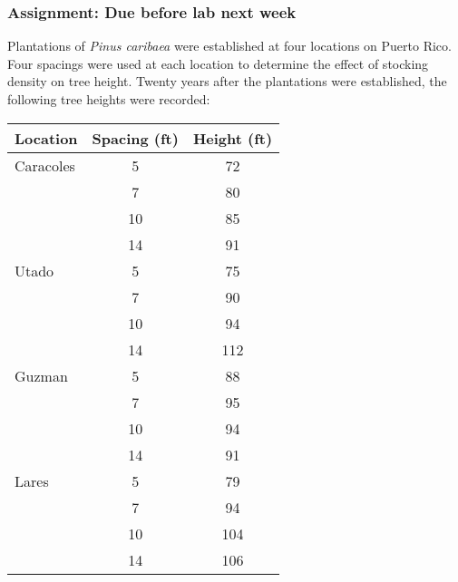 \documentclass[color=usenames,dvipsnames]{beamer}\usepackage[]{graphicx}\usepackage[]{color}
\begin{document}
\begin{frame}
  \frametitle{Assignment: Due before lab next week}
  \tiny
  Plantations of {\it Pinus caribaea} were established at
  four locations on Puerto Rico.  %
  Four spacings were used at each location to determine the effect of
  stocking density on tree height. Twenty years after the
  plantations were established, the following tree heights were recorded: \par
  \vfill
{  \centering
    \tiny %
    \begin{tabular}{lcc}
      \hline
      Location  & Spacing (ft) & Height (ft) \\
      \hline
      Caracoles & 5            & 72          \\
                & 7            & 80          \\
                & 10           & 85          \\
                & 14           & 91          \\
      Utado     & 5            & 75          \\
                & 7            & 90          \\
                & 10           & 94          \\
                & 14           & 112         \\
      Guzman    & 5            & 88          \\
                & 7            & 95          \\
                & 10           & 94          \\
                & 14           & 91          \\
      Lares     & 5            & 79          \\
                & 7            & 94          \\
                & 10           & 104         \\
                & 14           & 106         \\
      \hline
    \end{tabular} \\
    }

\end{frame}
\end{document}
